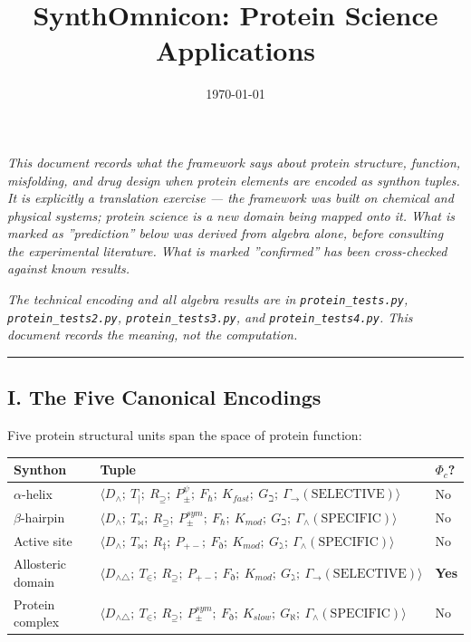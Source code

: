 \documentclass[10pt,a4paper]{article}
\begin{document}
\title{SynthOmnicon: Protein Science Applications}
\date{\today}

\maketitle

\emph{This document records what the framework says about protein structure, function, misfolding, and drug design when protein elements are encoded as synthon tuples. It is explicitly a translation exercise --- the framework was built on chemical and physical systems; protein science is a new domain being mapped onto it. What is marked as ''prediction'' below was derived from algebra alone, before consulting the experimental literature. What is marked ''confirmed'' has been cross-checked against known results.}

\emph{The technical encoding and all algebra results are in \texttt{protein\_tests.py}, \texttt{protein\_tests2.py}, \texttt{protein\_tests3.py}, and \texttt{protein\_tests4.py}. This document records the meaning, not the computation.}

\begin{center}
\rule{0.5\textwidth}{0.4pt}
\end{center}

\subsection{I. The Five Canonical Encodings}

Five protein structural units span the space of protein function:

\begin{table}[htbp]
\centering
\small
{}
\begin{tabularx}{\textwidth}{>{\centering\arraybackslash}X >{\centering\arraybackslash}X >{\centering\arraybackslash}X}
\toprule
\rowcolor{gray!25}\textbf{Synthon} & \textbf{Tuple} & \textbf{$\Phi_c$?} \\
\midrule
\rowcolors{1}{white}{gray!10}
$\alpha$-helix & $\langle D_\wedge;\ T_{\vert};\ R_\supseteq;\ P_\pm^\psi;\ F_\hbar;\ K_{fast};\ G_\beth;\ \Gamma_\to(\text{SELECTIVE})\rangle$ & No \\
$\beta$-hairpin & $\langle D_\wedge;\ T_\bowtie;\ R_\supseteq;\ P_\pm^{sym};\ F_\hbar;\ K_{mod};\ G_\beth;\ \Gamma_\wedge(\text{SPECIFIC})\rangle$ & No \\
Active site & $\langle D_\wedge;\ T_\bowtie;\ R_\ddagger;\ P_{+-};\ F_\eth;\ K_{mod};\ G_\gimel;\ \Gamma_\wedge(\text{SPECIFIC})\rangle$ & No \\
Allosteric domain & $\langle D_{\wedge\triangle};\ T_\in;\ R_\supseteq;\ P_{+-};\ F_\eth;\ K_{mod};\ G_\gimel;\ \Gamma_\to(\text{SELECTIVE})\rangle$ & \textbf{Yes} \\
Protein complex & $\langle D_{\wedge\triangle};\ T_\in;\ R_\supseteq;\ P_\pm^{sym};\ F_\eth;\ K_{slow};\ G_\aleph;\ \Gamma_\wedge(\text{SPECIFIC})\rangle$ & No \\
\bottomrule
\end{tabularx}
\end{table}
\end{document}
